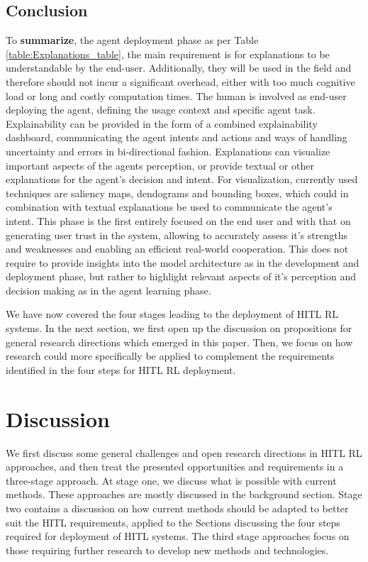 \documentclass[twoside,11pt]{article}
\begin{document}
\begin{enumerate}
\subsection{Conclusion}

\noindent To \textbf{summarize}, the agent deployment phase as per Table \ref{table:Explanations_table}, the main requirement is for explanations to be understandable by the end-user. Additionally, they will be used in the field and therefore should not incur a significant overhead, either with  too much cognitive load or long and costly computation times. The human is involved as end-user deploying the agent, defining the usage context and specific agent task. Explainability can be provided in the form of a combined explainability dashboard, communicating the agent intents and actions and ways of handling uncertainty and errors in bi-directional fashion. Explanations can visualize important aspects of the agents perception, or provide textual or other explanations for the agent's decision and intent. For visualization, currently used techniques are saliency maps, dendograms and bounding boxes, which could in combination with textual explanations be used to communicate the agent's intent. This phase is the first entirely focused on the end user and with that on generating user trust in the system, allowing to accurately assess it's strengths and weaknesses and enabling an efficient real-world cooperation. This does not require to provide insights into the model architecture as in the development and deployment phase, but rather to highlight relevant aspects of it's perception and decision making as in the agent learning phase.

We have now covered the four stages leading to the deployment of HITL RL systems. In the next section, we first open up the discussion on propositions for general research directions which emerged in this paper. Then, we focus on how research could more specifically be applied to complement the requirements identified in the four steps for HITL RL deployment.

\section{Discussion}
\label{sec:discussion}
We first discuss some general challenges and open research directions in HITL RL approaches, and then treat the presented opportunities and requirements in a three-stage approach. At stage one, we discuss what is possible with current methods. These approaches are mostly discussed in the background section. Stage two contains a discussion on how current methods should be adapted to better suit the HITL requirements, applied to the Sections discussing the four steps required for deployment of HITL systems. The third stage approaches focus on those requiring further research to develop new methods and technologies.


\end{enumerate}
\end{document}
